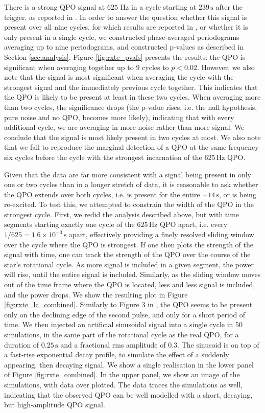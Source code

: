 \documentclass{emulateapj}
\begin{document}
There is a strong QPO signal at $625$ Hz in a cycle starting at $239\, \mathrm{s}$ after the trigger, as reported in \citet{Strohmayer06}. In order to answer the question whether this signal is present over all nine cycles, for which results are reported in \citet{Strohmayer05}, or whether it is only present in a single cycle, we constructed phase-averaged periodograms averaging up to nine periodograms, and constructed p-values as described in Section \ref{sec:analysis}. Figure \ref{fig:rxte_pvals} presents the results: the QPO is significant when averaging together up to $9$ cycles to $p < 0.02$. However, we also note that the signal is most significant when averaging the cycle with the strongest signal and the immediately previous cycle together. This indicates that the QPO is likely to be present at least in these two cycles. When averaging more than two cycles, the significance drops (the p-value rises, i.e. the null hypothesis, pure noise and no QPO, becomes more likely), indicating that with every additional cycle, we are averaging in more noise rather than more signal. We conclude that the signal is most likely present in two cycles at most.
We also note that we fail to reproduce the marginal detection of a QPO at the same frequency six cycles before the cycle with the strongest incarnation of the $625\, \mathrm{Hz}$ QPO. 

Given that the data are far more consistent with a signal being present in only one or two cycles than in a longer stretch of data, it is reasonable to ask whether the QPO extends over both cycles, i.e. is present for the entire $\sim 14\, \mathrm{s}$, or is being re-excited. To test this, we attempted to constrain the width of the QPO in the strongest cycle. First, we redid the analysis described above, but with time segments starting exactly one cycle of the $625 \, \mathrm{Hz}$ QPO apart, i.e. every $1/625 = 1.6 \times 10^{-3} \, \mathrm{s}$ apart, effectively providing a finely resolved sliding window over the cycle where the QPO is strongest. If one then plots the strength of the signal with time, one can track the strength of the QPO over the course of the star's rotational cycle. As more signal is included in a given segment, the power will rise, until the entire signal is included. Similarly, as the sliding window moves out of the time frame where the QPO is located, less and less signal is included, and the power drops. We show the resulting plot in Figure \ref{fig:rxte_lc_combined}. Similarly to Figure 3 in \citet{Strohmayer06}, the QPO seems to be present only on the declining edge of the second pulse, and only for a short period of time. We then injected an artificial sinusoidal signal into a single cycle in 50 simulations, in the same part of the rotational cycle as the real QPO, for a duration of $0.25\, \mathrm{s}$ and a fractional rms amplitude of $0.3$. The sinusoid is on top of a fast-rise exponential decay profile, to simulate the effect of a suddenly appearing, then decaying signal. We show a single realisation in the lower panel of Figure \ref{fig:rxte_combined}. In the upper panel, we show an image of the simulations, with data over plotted. The data traces the simulations as well, indicating that the observed QPO can be well modelled with a short, decaying, but high-amplitude QPO signal. 
\end{document}
